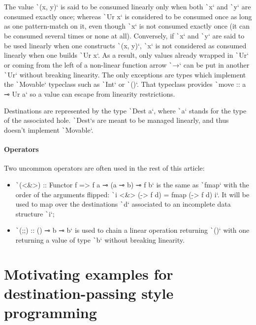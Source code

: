 \documentclass[english]{jflart}
\begin{document}
The value \texttt`(x, y)` is said to be consumed linearly only when both \texttt`x` and \texttt`y` are consumed exactly once; whereas \texttt`Ur x` is considered to be consumed once as long as one pattern-match on it, even though \texttt`x` is not consumed exactly once (it can be consumed several times or none at all). Conversely, if \texttt`x` and \texttt`y` are said to be used linearly when one constructs \texttt`(x, y)`, \texttt`x` is not considered as consumed linearly when one builds \texttt`Ur x`. As a result, only values already wrapped in \texttt`Ur` or coming from the left of a non-linear function arrow \texttt`→` can be put in another \texttt`Ur` without breaking linearity. The only exceptions are types which implement the \texttt`Movable` typeclass such as \texttt`Int` or \texttt`()`. That typeclass provides \texttt`move :: a ⊸ Ur a` so a value can escape from linearity restrictions.

Destinations are represented by the type \texttt`Dest a`, where \texttt`a` stands for the type of the associated hole. \texttt`Dest`s are meant to be managed linearly, and thus doesn't implement \texttt`Movable`.

\paragraph{Operators}

Two uncommon operators are often used in the rest of this article:
\begin{itemize}
  \item \texttt`(<&>) :: Functor f => f a ⊸ (a ⊸ b) ⊸ f b` is the same as \texttt`fmap` with the order of the arguments flipped: \texttt`i <&> (\d -> f d) = fmap (\d -> f d) i`. It will be used to map over the destinations \texttt`d` associated to an incomplete data structure \texttt`i`;
  \item \texttt`(;;) :: () ⊸ b ⊸ b` is used to chain a linear operation returning \texttt`()` with one returning a value of type \texttt`b` without breaking linearity.
\end{itemize}

\section{Motivating examples for destination-passing style programming}\label{sec:motivating-examples}
\end{document}
